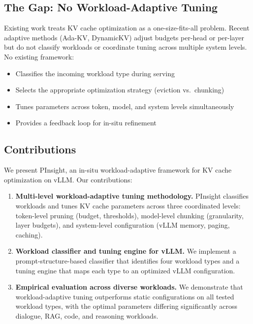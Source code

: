 \documentclass[conference]{IEEEtran}
\begin{document}
\subsection{The Gap: No Workload-Adaptive Tuning}

Existing work treats KV cache optimization as a one-size-fits-all problem. Recent adaptive methods (Ada-KV, DynamicKV) adjust budgets per-head or per-layer but do not classify workloads or coordinate tuning across multiple system levels. No existing framework:
\begin{itemize}
\item Classifies the incoming workload type during serving
\item Selects the appropriate optimization strategy (eviction vs.\ chunking)
\item Tunes parameters across token, model, and system levels simultaneously
\item Provides a feedback loop for in-situ refinement
\end{itemize}

\subsection{Contributions}

We present PInsight, an in-situ workload-adaptive framework for KV cache optimization on vLLM. Our contributions:

\begin{enumerate}
\item \textbf{Multi-level workload-adaptive tuning methodology.} PInsight classifies workloads and tunes KV cache parameters across three coordinated levels: token-level pruning (budget, thresholds), model-level chunking (granularity, layer budgets), and system-level configuration (vLLM memory, paging, caching).

\item \textbf{Workload classifier and tuning engine for vLLM.} We implement a prompt-structure-based classifier that identifies four workload types and a tuning engine that maps each type to an optimized vLLM configuration.

\item \textbf{Empirical evaluation across diverse workloads.} We demonstrate that workload-adaptive tuning outperforms static configurations on all tested workload types, with the optimal parameters differing significantly across dialogue, RAG, code, and reasoning workloads.
\end{enumerate}
\end{document}
